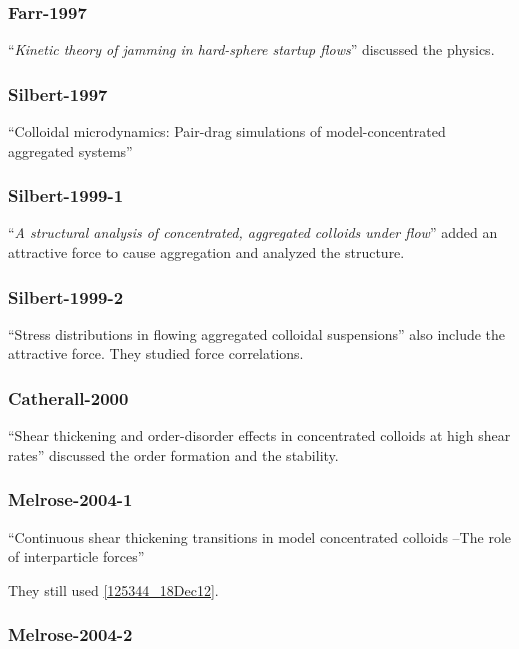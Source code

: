 \documentclass[12pt]{article}
\begin{document}
\subsubsection*{Farr-1997}

\citet{Farr_1997} 
``\emph{Kinetic theory of jamming in hard-sphere startup flows}''
discussed the physics.

\subsubsection*{Silbert-1997}
\citet{Silbert_1997}
``Colloidal microdynamics: Pair-drag simulations of model-concentrated aggregated systems''


\subsubsection*{Silbert-1999-1}
\citet{Silbert_1999}
``\emph{A structural analysis of concentrated, aggregated colloids under flow}''
added an attractive force to cause 
aggregation and analyzed the structure.

\subsubsection*{Silbert-1999-2}
\citet{Silbert_1999a}
``Stress distributions in flowing aggregated colloidal suspensions''
also include the attractive force.
%
They studied force correlations.

\subsubsection*{Catherall-2000}

\citet{Catherall_2000}
``Shear thickening and order-disorder effects in concentrated colloids at high shear rates''
discussed the order formation and the stability.

\subsubsection*{Melrose-2004-1}

\citet{Melrose_2004a}
``Continuous shear thickening transitions in model concentrated colloids
--The role of interparticle forces''

They still used \eqref{125344_18Dec12}.

\subsubsection*{Melrose-2004-2}
\end{document}
